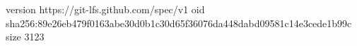 version https://git-lfs.github.com/spec/v1
oid sha256:89e26eb479f0163abe30d0b1c30d65f36076da448dabd09581c14e3cede1b99c
size 3123
